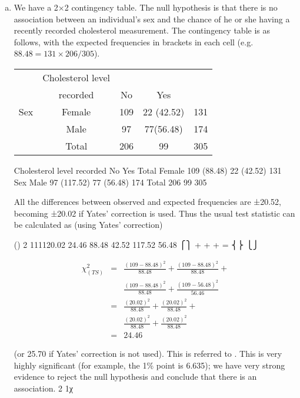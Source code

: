 \documentclass[a4paper,12pt]{article}
\begin{document}
\begin{enumerate}[(a)] 
\item  We have a 2×2 contingency table.  The null hypothesis is that there is no association between an individual's sex and the chance of he or she having a recently recorded cholesterol measurement.  The contingency table is as follows, with the expected frequencies in brackets in each cell (e.g. $88.48 = 131 \times 206 / 305$). 

\begin{center}
 \begin{tabular}{|cc|c|c|c|} \hline
  & Cholesterol level && &\\ 
  & recorded &   No& Yes &\\ \hline \hline
  Sex & Female & 109&  22 (42.52) & 131\\ \hline
      & Male & 97&  77(56.48) & 174 \\ \hline
      & Total & 206 & 99 & 305\\ \hline
 \end{tabular}
 \end{center}
  
  Cholesterol level 
  recorded    No Yes Total 
  Female 109     (88.48) 22  (42.52) 131    
  Sex Male   97   (117.52) 77  (56.48) 174  
  Total 206 99 305 
 
All the differences between observed and expected frequencies are ±20.52, becoming ±20.02 if Yates' correction is used.  Thus the usual test statistic can be calculated as (using Yates' correction) 
 
() 2 111120.02 24.46 88.48 42.52 117.52 56.48 ⎧⎫ + + + = ⎨⎬ ⎩⎭
 
 \begin{eqnarray*} 
 \chi^2_{(TS)} &=&  \frac{(109-88.48)^2}{88.48} + \frac{(109-88.48)^2}{88.48} + \\
 & & \frac{(109-88.48)^2}{88.48} +\frac{(109-56.48)^2}{56.46}\\
 &=&  \frac{(20.02)^2}{88.48} + \frac{(20.02)^2}{88.48} + \\
 & & \frac{(20.02)^2}{88.48} +\frac{(20.02)^2}{88.48}\\
 &=& 24.46
 \end{eqnarray*}
 
(or 25.70 if Yates' correction is not used).  This is referred to .  This is very highly significant (for example, the 1\% point is 6.635);  we have very strong evidence to reject the null hypothesis and conclude that there is an association. 2 1χ


\end{enumerate}
\end{document}
